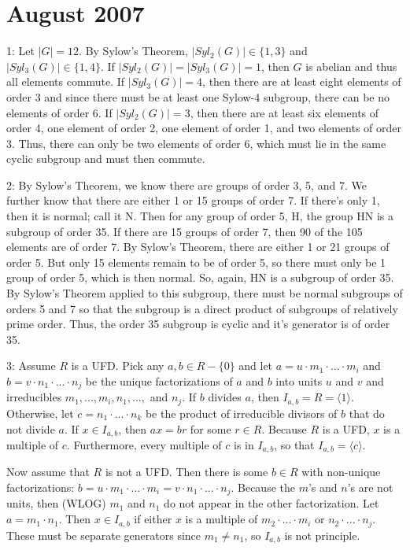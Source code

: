\documentclass[12pt]{article}
\begin{document}
\section{August 2007}

1: Let $|G|=12$. By Sylow's Theorem, $|Syl_2(G)| \in \{1,3\}$ and $|Syl_3(G)| \in \{1,4\}$. If $|Syl_2(G)|=|Syl_3(G)|=1$, then $G$ is abelian and thus all elements commute. If $|Syl_3(G)|=4$, then there are at least eight elements of order $3$ and since there must be at least one Sylow-4 subgroup, there can be no elements of order 6. If $|Syl_2(G)|=3$, then there are at least six elements of order 4, one element of order 2, one element of order 1, and two elements of order 3. Thus, there can only be two elements of order 6, which must lie in the same cyclic subgroup and must then commute. \newline

2: By Sylow's Theorem, we know there are groups of order 3, 5, and 7. We further know that there are either 1 or 15 groups of order 7. If there's only 1, then it is normal; call it N. Then for any group of order 5, H, the group HN is a subgroup of order 35. If there are 15 groups of order 7, then 90 of the 105 elements are of order 7. By Sylow's Theorem, there are either 1 or 21 groups of order 5. But only 15 elements remain to be of order 5, so there must only be 1 group of order 5, which is then normal. So, again, HN is a subgroup of order 35. By Sylow's Theorem applied to this subgroup, there must be normal subgroups of orders 5 and 7 so that the subgroup is a direct product of subgroups of relatively prime order. Thus, the order 35 subgroup is cyclic and it's generator is of order 35. \newline

3: Assume $R$ is a UFD. Pick any $a,b \in R - \{0\}$ and let $a=u \cdot m_1 \cdot ... \cdot m_i$ and $b=v \cdot n_1 \cdot ... \cdot n_j$ be the unique factorizations of $a$ and $b$ into units $u$ and $v$ and irreducibles $m_1, ..., m_i, n_1, ...,$ and $n_j$. If $b$ divides $a$, then $I_{a,b}=R=\langle 1 \rangle$. Otherwise, let $c=n_1 \cdot ... \cdot n_k$ be the product of irreducible divisors of $b$ that do not divide $a$. If $x \in I_{a,b}$, then $ax=br$ for some $r \in R$. Because $R$ is a UFD, $x$ is a multiple of $c$. Furthermore, every multiple of $c$ is in $I_{a,b}$, so that $I_{a,b}=\langle c \rangle$. \newline

Now assume that $R$ is not a UFD. Then there is some $b \in R$ with non-unique factorizations: $b=u \cdot m_1 \cdot ... \cdot m_i=v \cdot n_1 \cdot ... \cdot n_j$. Because the $m$'s and $n$'s are not units, then (WLOG) $m_1$ and $n_1$ do not appear in the other factorization. Let $a=m_1 \cdot n_1$. Then $x \in I_{a,b}$ if either $x$ is a multiple of $m_2 \cdot ... \cdot m_i$ or $n_2 \cdot ... \cdot n_j$. These must be separate generators since $m_1 \neq n_1$, so $I_{a,b}$ is not principle. \newline
\end{document}
